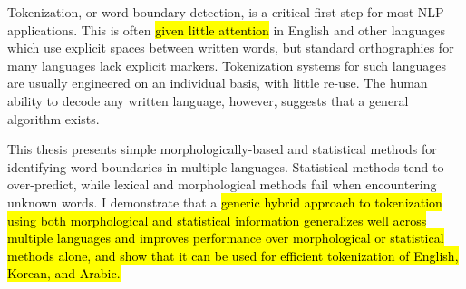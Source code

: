 Tokenization, or word boundary detection, is a critical first step for most NLP applications. This is often \hl{given little attention} in English and other languages which use explicit spaces between written words, but standard orthographies for many languages lack explicit markers. Tokenization systems for such languages are usually engineered on an individual basis, with little re-use. The human ability to decode any written language, however, suggests that a general algorithm exists.

This thesis presents simple morphologically-based and statistical methods for identifying word boundaries in multiple languages. Statistical methods tend to over-predict, while lexical and morphological methods fail when encountering unknown words. I demonstrate that a \hl{generic hybrid approach to tokenization using both morphological and statistical information generalizes well across multiple languages and improves performance over morphological or statistical methods alone, and show that it can be used for efficient tokenization of English, Korean, and Arabic.}